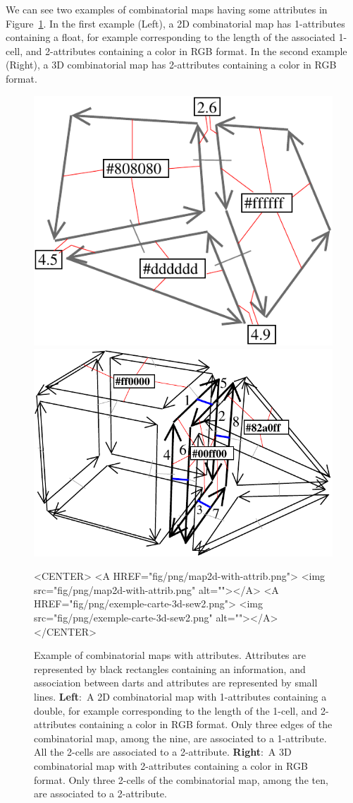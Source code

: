 We can see two examples of combinatorial maps having some
attributes in Figure~\ref{fig-exemple-attribs}. In the first example
(Left), a 2D combinatorial map has 1-attributes containing a float,
for example corresponding to the length of the associated 1-cell, and
2-attributes containing a color in RGB format.  In the second example
(Right), a 3D combinatorial map has 2-attributes containing a color
in RGB format.
%
\begin{figure}
  \begin{ccTexOnly}
    \begin{center}
      \includegraphics[width=.3\textwidth]{Combinatorial_map/fig/pdf/map2d-with-attrib}\qquad
      \includegraphics[width=.45\textwidth]{Combinatorial_map/fig/pdf/exemple-carte-3d-sew2}
    \end{center}
  \end{ccTexOnly}
  \begin{ccHtmlOnly}
    <CENTER> <A HREF="fig/png/map2d-with-attrib.png"> <img
    src="fig/png/map2d-with-attrib.png" alt=""></A> <A
    HREF="fig/png/exemple-carte-3d-sew2.png"> <img
    src="fig/png/exemple-carte-3d-sew2.png" alt=""></A> </CENTER>
  \end{ccHtmlOnly}
  \caption{Example of combinatorial maps with attributes. Attributes
    are represented by black rectangles containing an information, and
    association between darts and attributes are represented by small
    lines.  \textbf{Left}:~A 2D combinatorial map with 1-attributes
    containing a double, for example corresponding to the length of
    the 1-cell, and 2-attributes containing a color in RGB format.
    Only three edges of the combinatorial map, among the nine, are
    associated to a 1-attribute. All the 2-cells are associated to a
    2-attribute. \textbf{Right}:~A 3D combinatorial map with
    2-attributes containing a color in RGB format. Only three 2-cells
    of the combinatorial map, among the ten, are associated to a
    2-attribute.}
  \label{fig-exemple-attribs}
\end{figure}

